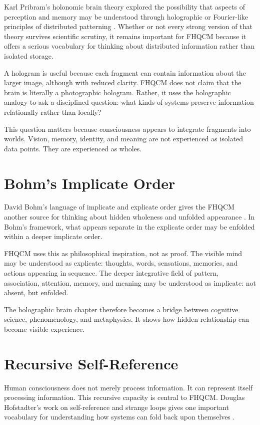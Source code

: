 Karl Pribram's holonomic brain theory explored the possibility that aspects of perception and memory may be understood through holographic or Fourier-like principles of distributed patterning \cite{pribram1991Brain}. Whether or not every strong version of that theory survives scientific scrutiny, it remains important for FHQCM because it offers a serious vocabulary for thinking about distributed information rather than isolated storage.

A hologram is useful because each fragment can contain information about the larger image, although with reduced clarity. FHQCM does not claim that the brain is literally a photographic hologram. Rather, it uses the holographic analogy to ask a disciplined question: what kinds of systems preserve information relationally rather than locally?

This question matters because consciousness appears to integrate fragments into worlds. Vision, memory, identity, and meaning are not experienced as isolated data points. They are experienced as wholes.

\section{Bohm's Implicate Order}

David Bohm's language of implicate and explicate order gives the FHQCM another source for thinking about hidden wholeness and unfolded appearance \cite{bohm1980Wholeness}. In Bohm's framework, what appears separate in the explicate order may be enfolded within a deeper implicate order.

FHQCM uses this as philosophical inspiration, not as proof. The visible mind may be understood as explicate: thoughts, words, sensations, memories, and actions appearing in sequence. The deeper integrative field of pattern, association, attention, memory, and meaning may be understood as implicate: not absent, but enfolded.

The holographic brain chapter therefore becomes a bridge between cognitive science, phenomenology, and metaphysics. It shows how hidden relationship can become visible experience.

\section{Recursive Self-Reference}

Human consciousness does not merely process information. It can represent itself processing information. This recursive capacity is central to FHQCM. Douglas Hofstadter's work on self-reference and strange loops gives one important vocabulary for understanding how systems can fold back upon themselves \cite{hofstadter1979GEB}.

